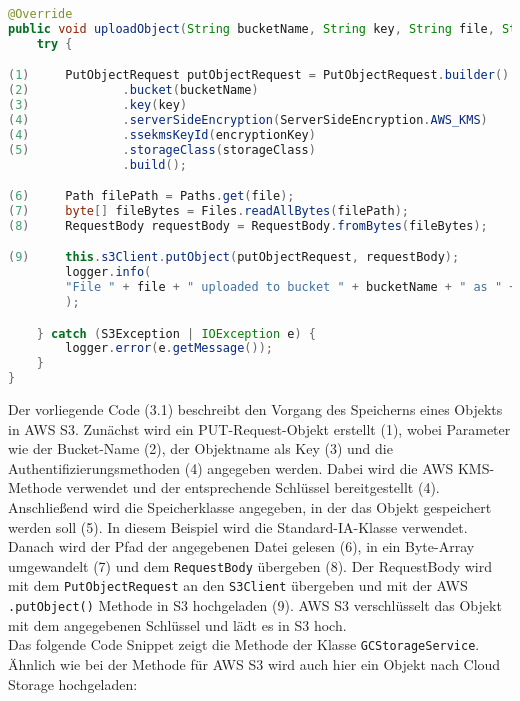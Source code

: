 \begin{lstlisting}[language=Java, caption=Prototyp Code Snippet - Hochladen eines Objekts nach S3]
@Override
public void uploadObject(String bucketName, String key, String file, String encryptionKey, String storageClass) {
    try {

(1)     PutObjectRequest putObjectRequest = PutObjectRequest.builder()
(2)             .bucket(bucketName)
(3)             .key(key)
(4)             .serverSideEncryption(ServerSideEncryption.AWS_KMS)
(4)             .ssekmsKeyId(encryptionKey)
(5)             .storageClass(storageClass)
                .build();

(6)     Path filePath = Paths.get(file);
(7)     byte[] fileBytes = Files.readAllBytes(filePath);
(8)     RequestBody requestBody = RequestBody.fromBytes(fileBytes);

(9)     this.s3Client.putObject(putObjectRequest, requestBody);
        logger.info(
        "File " + file + " uploaded to bucket " + bucketName + " as " + key
        );

    } catch (S3Exception | IOException e) {
        logger.error(e.getMessage());
    }
}
\end{lstlisting}

\newpage

Der vorliegende Code (3.1) beschreibt den Vorgang des Speicherns eines Objekts in AWS S3. Zunächst wird ein PUT-Request-Objekt erstellt (1), wobei Parameter wie der Bucket-Name (2), der Objektname als Key (3) und die Authentifizierungsmethoden (4) angegeben werden. Dabei wird die AWS KMS-Methode verwendet und der entsprechende Schlüssel bereitgestellt (4). Anschließend wird die Speicherklasse angegeben, in der das Objekt gespeichert werden soll (5). In diesem Beispiel wird die Standard-IA-Klasse verwendet. Danach wird der Pfad der angegebenen Datei gelesen (6), in ein Byte-Array umgewandelt (7) und dem \verb|RequestBody| übergeben (8). Der RequestBody wird mit dem \verb|PutObjectRequest| an den \verb|S3Client| übergeben und mit der AWS \verb|.putObject()| Methode in S3 hochgeladen (9). AWS S3 verschlüsselt das Objekt mit dem angegebenen Schlüssel und lädt es in S3 hoch.\\

Das folgende Code Snippet zeigt die Methode der Klasse \verb|GCStorageService|. Ähnlich wie bei der Methode für AWS S3 wird auch hier ein Objekt nach Cloud Storage hochgeladen:

